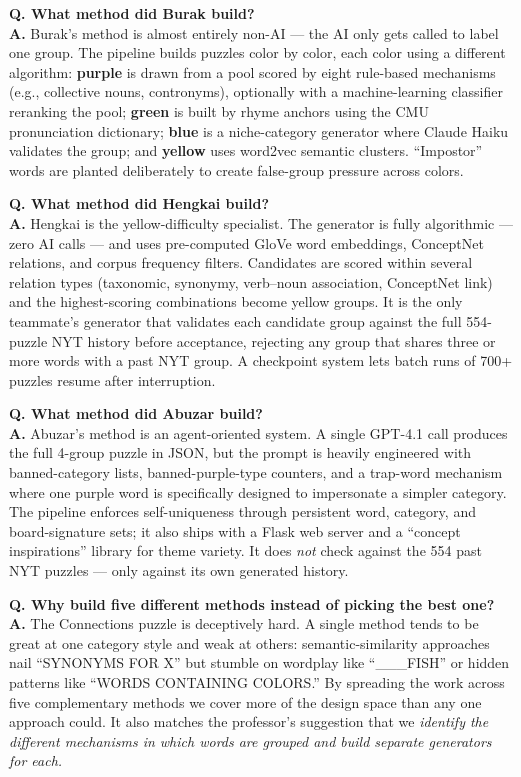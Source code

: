 \documentclass[11pt, letterpaper]{article}
\newcommand{\qitem}[1]{\vspace{0.6em}\noindent\textbf{\color{accent}Q. #1}\\[0.2em]}
\newcommand{\aitem}{\noindent\textbf{A.} }
\begin{document}
\qitem{What method did Burak build?}
\aitem
Burak's method is almost entirely non-AI --- the AI only gets called to label
one group. The pipeline builds puzzles color by color, each color using a
different algorithm: \textbf{purple} is drawn from a pool scored by eight
rule-based mechanisms (e.g., collective nouns, contronyms), optionally with a
machine-learning classifier reranking the pool; \textbf{green} is built by
rhyme anchors using the CMU pronunciation dictionary; \textbf{blue} is a
niche-category generator where Claude Haiku validates the group; and
\textbf{yellow} uses word2vec semantic clusters. ``Impostor'' words are
planted deliberately to create false-group pressure across colors.

\qitem{What method did Hengkai build?}
\aitem
Hengkai is the yellow-difficulty specialist. The generator is fully
algorithmic --- zero AI calls --- and uses pre-computed GloVe word embeddings,
ConceptNet relations, and corpus frequency filters. Candidates are scored
within several relation types (taxonomic, synonymy, verb--noun association,
ConceptNet link) and the highest-scoring combinations become yellow groups.
It is the only teammate's generator that validates each candidate group
against the full 554-puzzle NYT history before acceptance, rejecting any
group that shares three or more words with a past NYT group. A checkpoint
system lets batch runs of 700+ puzzles resume after interruption.

\qitem{What method did Abuzar build?}
\aitem
Abuzar's method is an agent-oriented system. A single GPT-4.1 call produces
the full 4-group puzzle in JSON, but the prompt is heavily engineered with
banned-category lists, banned-purple-type counters, and a trap-word
mechanism where one purple word is specifically designed to impersonate a
simpler category. The pipeline enforces self-uniqueness through persistent
word, category, and board-signature sets; it also ships with a Flask web
server and a ``concept inspirations'' library for theme variety. It does
\emph{not} check against the 554 past NYT puzzles --- only against its own
generated history.

\qitem{Why build five different methods instead of picking the best one?}
\aitem
The Connections puzzle is deceptively hard. A single method tends to be great
at one category style and weak at others: semantic-similarity approaches nail
``SYNONYMS FOR X'' but stumble on wordplay like ``\_\_\_FISH'' or hidden
patterns like ``WORDS CONTAINING COLORS.'' By spreading the work across five
complementary methods we cover more of the design space than any one
approach could. It also matches the professor's suggestion that we
\emph{identify the different mechanisms in which words are grouped and build
separate generators for each.}
\end{document}
